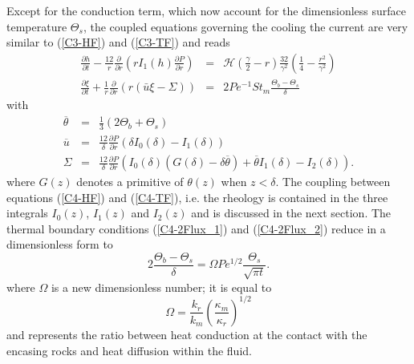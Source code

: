 Except  for   the  conduction   term,  which   now  account   for  the
dimensionless  surface temperature  $\Theta_s$, the  coupled equations
governing the  cooling the current  are very similar  to (\ref{C3-HF})
and (\ref{C3-TF}) and reads
\begin{eqnarray}
  \frac{\partial h}{\partial t}-\frac{12}{r}
  \frac{\partial}{\partial      r}
  \left( r I_1(h) \frac{\partial P}{\partial
  r}\right)
  \label{C4-HF}
  & =& \mathcal{H}(\frac{\gamma}{2}-r)\frac{32}{\gamma^{2}}\left(\frac{1}{4}-\frac{r^{2}}{\gamma^{2}}\right)\\
  \frac{\partial                                       \xi}{\partial
  t}+\frac{1}{r}\frac{\partial}{\partial                          r}
  \left( r\left(\bar{u}\xi-\Sigma\right)\right)&=&2Pe^{-1}St_m\frac{\Theta_b-\Theta_s}{\delta}\label{C4-TF}
\end{eqnarray}
with
\begin{eqnarray}
  \overline{\theta}&=&\frac{1}{3}\left(2\Theta_b+\Theta_s\right)\label{C4-tbar}\\
  \overline{u}&=&\frac{12}{\delta}
                  \frac{\partial
                  P}{\partial
                  r}\left(\delta
                  I_0(\delta)-I_1(\delta)\right)\\
  \Sigma &=& \frac{12}{\delta} \frac{\partial P}{\partial r}\left(I_0(\delta)\left(G(\delta)-\delta\overline{\theta}\right)+\overline{\theta}I_1(\delta)-I_2(\delta)\right).
\end{eqnarray}
where $G(z)$ denotes  a primitive of $\theta(z)$  when $z<\delta$. The
coupling between equations (\ref{C4-HF}) and (\ref{C4-TF}), i.e. the rheology is
contained in the  three integrals $I_0(z)$, $I_1(z)$  and $I_2(z)$ and
is discussed  in the  next section.   The thermal  boundary conditions
(\ref{C4-2Flux_1})  and (\ref{C4-2Flux_2})  reduce in  a dimensionless
form to
\begin{equation}
  2\frac{\Theta_b-\Theta_s}{\delta}               =               \Omega
  Pe^{1/2}\frac{\Theta_s}{\sqrt{\pi t}}.
  \label{C4-Boundary-Condi}
\end{equation}
where $\Omega$ is a new dimensionless number; it is equal to
\begin{equation}
  \Omega=\frac{k_r}{k_m}\left(\frac{\kappa_m}{\kappa_r}\right)^{1/2}\label{C4-omega}
\end{equation}
and represents the  ratio between heat conduction at  the contact with
the encasing rocks and heat diffusion within the fluid.

